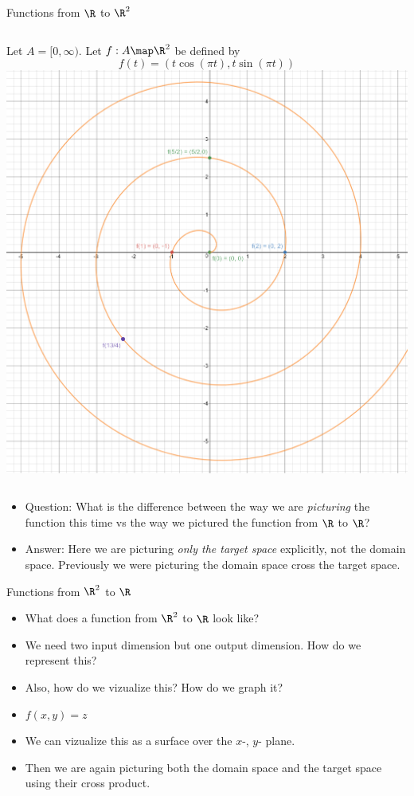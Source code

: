 \documentclass{beamer}
\begin{document}
\begin{frame}{Functions from $\R$ to $\R^2$}

\begin{columns}
\column[T]{5cm}
Let $A=[0, \infty)$. Let $f:A\map \R^2$ be defined by
$$f(t) = (t \cos(\pi t), t \sin(\pi t))$$
\column[T]{5cm}
\includegraphics[scale=0.1]{spiral}
\end{columns}

\begin{itemize}
\item Question: What is the difference between the way we are \emph{picturing}
the function this time vs the way we pictured the function from
$\R$ to $\R$?
\item Answer: Here we are picturing \emph{only the target space} explicitly, not
the domain space. Previously we were picturing the domain space cross
the target space.
\end{itemize}

\end{frame}

\begin{frame}{Functions from $\R^2$ to $\R$}

\begin{itemize}
\item What does a function from $\R^2$ to $\R$ look like?
\item We need two input dimension but one output dimension.
How do we represent this?
\item Also, how do we vizualize this? How do we graph it?
\item $f(x,y) = z$
\item We can vizualize this as a surface over the $x$-, $y$- plane.
\item Then we are again picturing both the domain space and the target space
using their cross product.
\end{itemize}

\end{frame}
\end{document}

